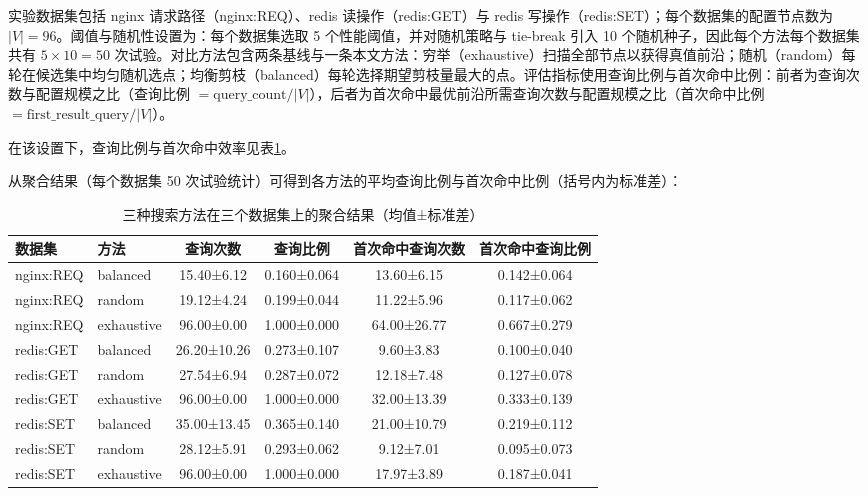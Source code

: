 \documentclass[UTF8,a4paper,12pt,twoside]{ctexart}  %
\begin{document}
实验数据集包括 nginx 请求路径（nginx:REQ）、redis 读操作（redis:GET）与
redis 写操作（redis:SET）；每个数据集的配置节点数为
\(|V|=96\)。阈值与随机性设置为：每个数据集选取 5
个性能阈值，并对随机策略与 tie-break 引入 10
个随机种子，因此每个方法每个数据集共有 \(5\times 10=50\)
次试验。对比方法包含两条基线与一条本文方法：穷举（exhaustive）扫描全部节点以获得真值前沿；随机（random）每轮在候选集中均匀随机选点；均衡剪枝（balanced）每轮选择期望剪枝量最大的点。评估指标使用查询比例与首次命中比例：前者为查询次数与配置规模之比（查询比例
\(=\text{query\_count}/|V|\)），后者为首次命中最优前沿所需查询次数与配置规模之比（首次命中比例
\(=\text{first\_result\_query}/|V|\)）。

在该设置下，查询比例与首次命中效率见表\ref{tab:search-agg-results}。

从聚合结果（每个数据集 50
次试验统计）可得到各方法的平均查询比例与首次命中比例（括号内为标准差）：
\begin{table}[htbp]
  \centering
  \small
  \setlength{\tabcolsep}{4pt}
  \begin{tabular}{llcccc}
    \toprule
    数据集       & 方法         & 查询次数        & 查询比例        & 首次命中查询次数    & 首次命中查询比例    \\
    \midrule
    nginx:REQ & balanced   & 15.40±6.12  & 0.160±0.064 & 13.60±6.15  & 0.142±0.064 \\
    nginx:REQ & random     & 19.12±4.24  & 0.199±0.044 & 11.22±5.96  & 0.117±0.062 \\
    nginx:REQ & exhaustive & 96.00±0.00  & 1.000±0.000 & 64.00±26.77 & 0.667±0.279 \\
    redis:GET & balanced   & 26.20±10.26 & 0.273±0.107 & 9.60±3.83   & 0.100±0.040 \\
    redis:GET & random     & 27.54±6.94  & 0.287±0.072 & 12.18±7.48  & 0.127±0.078 \\
    redis:GET & exhaustive & 96.00±0.00  & 1.000±0.000 & 32.00±13.39 & 0.333±0.139 \\
    redis:SET & balanced   & 35.00±13.45 & 0.365±0.140 & 21.00±10.79 & 0.219±0.112 \\
    redis:SET & random     & 28.12±5.91  & 0.293±0.062 & 9.12±7.01   & 0.095±0.073 \\
    redis:SET & exhaustive & 96.00±0.00  & 1.000±0.000 & 17.97±3.89  & 0.187±0.041 \\
    \bottomrule
  \end{tabular}
  \caption{三种搜索方法在三个数据集上的聚合结果（均值±标准差）}
  \label{tab:search-agg-results}
\end{table}
\end{document}

